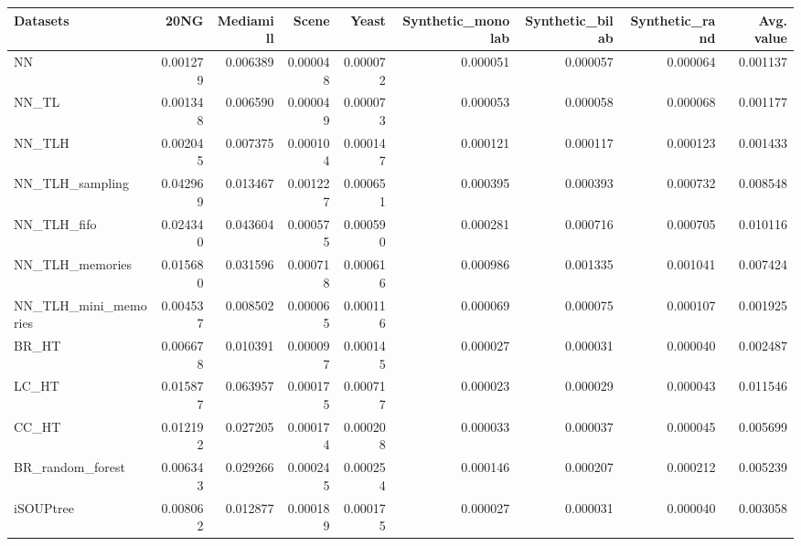 \begin{tabular}{lrrrrrrrr}
\toprule
Datasets &      20NG &  Mediamill &     Scene &     Yeast &  Synthetic\_monolab &  Synthetic\_bilab &  Synthetic\_rand &  Avg. value \\
\midrule
NN                   &  0.001279 &   0.006389 &  0.000048 &  0.000072 &           0.000051 &         0.000057 &        0.000064 &    0.001137 \\
NN\_TL                &  0.001348 &   0.006590 &  0.000049 &  0.000073 &           0.000053 &         0.000058 &        0.000068 &    0.001177 \\
NN\_TLH               &  0.002045 &   0.007375 &  0.000104 &  0.000147 &           0.000121 &         0.000117 &        0.000123 &    0.001433 \\
NN\_TLH\_sampling      &  0.042969 &   0.013467 &  0.001227 &  0.000651 &           0.000395 &         0.000393 &        0.000732 &    0.008548 \\
NN\_TLH\_fifo          &  0.024340 &   0.043604 &  0.000575 &  0.000590 &           0.000281 &         0.000716 &        0.000705 &    0.010116 \\
NN\_TLH\_memories      &  0.015680 &   0.031596 &  0.000718 &  0.000616 &           0.000986 &         0.001335 &        0.001041 &    0.007424 \\
NN\_TLH\_mini\_memories &  0.004537 &   0.008502 &  0.000065 &  0.000116 &           0.000069 &         0.000075 &        0.000107 &    0.001925 \\
BR\_HT                &  0.006678 &   0.010391 &  0.000097 &  0.000145 &           0.000027 &         0.000031 &        0.000040 &    0.002487 \\
LC\_HT                &  0.015877 &   0.063957 &  0.000175 &  0.000717 &           0.000023 &         0.000029 &        0.000043 &    0.011546 \\
CC\_HT                &  0.012192 &   0.027205 &  0.000174 &  0.000208 &           0.000033 &         0.000037 &        0.000045 &    0.005699 \\
BR\_random\_forest     &  0.006343 &   0.029266 &  0.000245 &  0.000254 &           0.000146 &         0.000207 &        0.000212 &    0.005239 \\
iSOUPtree            &  0.008062 &   0.012877 &  0.000189 &  0.000175 &           0.000027 &         0.000031 &        0.000040 &    0.003058 \\
\bottomrule
\end{tabular}
